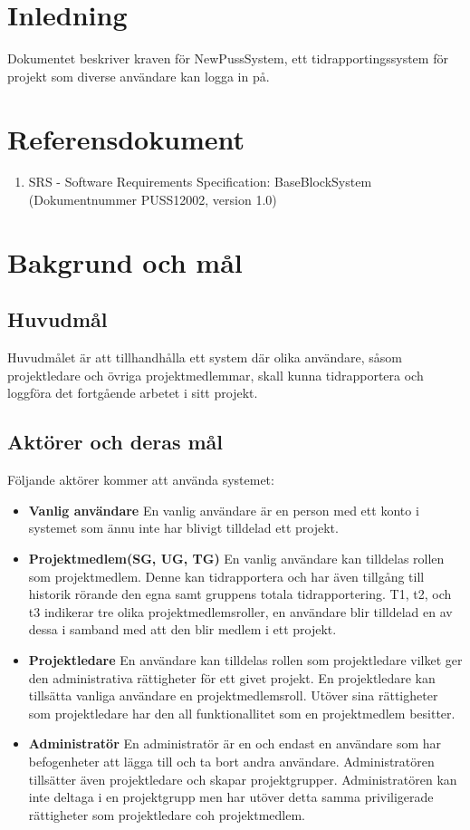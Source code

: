 \documentclass[a4paper]{article}
\begin{document}
\section{Inledning}       
Dokumentet beskriver kraven för NewPussSystem, ett tidrapportingssystem för projekt som diverse användare kan logga in på.

\section{Referensdokument}
\begin{enumerate}
\item SRS - Software Requirements Specification: BaseBlockSystem (Dokumentnummer PUSS12002, version 1.0)
\end{enumerate}
\section{Bakgrund och mål}   
\subsection{Huvudmål}
Huvudmålet är att tillhandhålla ett system där olika användare, såsom projektledare och övriga projektmedlemmar, skall kunna tidrapportera och loggföra det fortgående arbetet i sitt projekt. 

\subsection{Aktörer och deras mål}
\label{bom-aktorer}
Följande aktörer kommer att använda systemet:
\begin{itemize}
\item [] \textbf{Vanlig användare} En vanlig användare är en person med ett konto i systemet som ännu inte har blivigt tilldelad ett projekt.
\item [] \textbf{Projektmedlem(SG, UG, TG)} En vanlig användare kan tilldelas rollen som projektmedlem. Denne kan tidrapportera och har även tillgång till historik rörande den egna samt gruppens totala tidrapportering. T1, t2, och t3 indikerar tre olika projektmedlemsroller, en användare blir tilldelad en av dessa i samband med att den blir medlem i ett projekt.
\item [] \textbf{Projektledare} En användare kan tilldelas rollen som projektledare vilket ger den administrativa rättigheter för ett givet projekt. En projektledare kan tillsätta vanliga användare en projektmedlemsroll. Utöver sina rättigheter som projektledare har den all funktionallitet som en projektmedlem besitter.
\item [] \textbf{Administratör} En administratör är en och endast en användare som har befogenheter att lägga till och ta bort andra användare. Administratören tillsätter även projektledare och skapar projektgrupper. Administratören kan inte deltaga i en projektgrupp men har utöver detta samma priviligerade rättigheter som projektledare coh projektmedlem.
\end{itemize}
\end{document}

